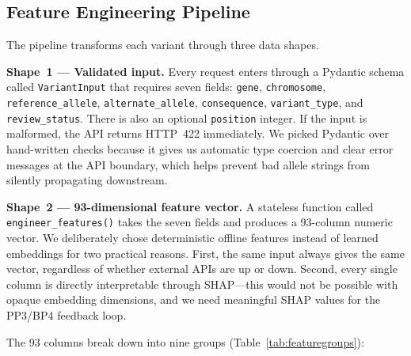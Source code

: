 \documentclass[12pt,a4paper]{article}
\begin{document}
\subsection{Feature Engineering Pipeline}

The pipeline transforms each variant through three data shapes.

\textbf{Shape~1 --- Validated input.}
Every request enters through a Pydantic schema called
\texttt{VariantInput} that requires seven fields: \texttt{gene},
\texttt{chromosome}, \texttt{reference\_allele},
\texttt{alternate\_allele}, \texttt{consequence},
\texttt{variant\_type}, and \texttt{review\_status}. There is also
an optional \texttt{position} integer. If the input is malformed,
the API returns HTTP~422 immediately. We picked Pydantic over
hand-written checks because it gives us automatic type coercion
and clear error messages at the API boundary, which helps prevent
bad allele strings from silently propagating downstream.

\textbf{Shape~2 --- 93-dimensional feature vector.}
A stateless function called \texttt{engineer\_features()} takes
the seven fields and produces a 93-column numeric vector. We
deliberately chose deterministic offline features instead of
learned embeddings for two practical reasons. First, the same
input always gives the same vector, regardless of whether external
APIs are up or down. Second, every single column is directly
interpretable through SHAP---this would not be possible with
opaque embedding dimensions, and we need meaningful SHAP values
for the PP3/BP4 feedback loop.

The 93 columns break down into nine groups
(Table~\ref{tab:featuregroups}):
\end{document}

